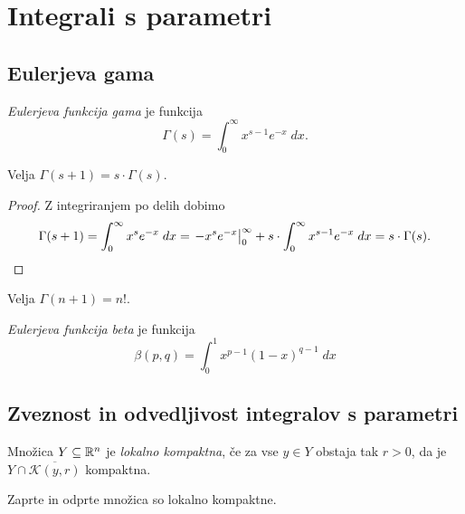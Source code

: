 \section{Integrali s parametri}

\subsection{Eulerjeva gama}


\begin{definicija}
\emph{Eulerjeva funkcija gama} je funkcija
\[
\Gamma(s) = \int_0^\infty x^{s-1} e^{-x}\;dx.
\]
\end{definicija}

\begin{trditev}
Velja $\Gamma(s+1) = s \cdot \Gamma(s)$.
\end{trditev}

\begin{proof}
Z integriranjem po delih dobimo
\[
\Gamma(s+1) =
\int_0^\infty x^s e^{-x}\;dx =
\left. -x^s e^{-x}\right|_{0}^{\infty} +
s \cdot \int_0^\infty x^{s-1} e^{-x}\;dx =
s \cdot \Gamma(s). \qedhere
\]
\end{proof}

\begin{posledica}
Velja $\Gamma(n+1) = n!$.
\end{posledica}

\begin{definicija}
\emph{Eulerjeva funkcija beta} je funkcija
\[
\beta(p,q) = \int_0^1 x^{p-1}(1-x)^{q-1}\;dx
\]
\end{definicija}

\newpage

\subsection{Zveznost in odvedljivost integralov s parametri}

\begin{definicija}
Množica $Y \subseteq \mathbb{R}^n$ je
\emph{lokalno kompaktna}, če za
vse $y \in Y$ obstaja tak $r>0$, da je
$Y \cap \overline{\mathcal{K}(y,r)}$ kompaktna.
\end{definicija}

\begin{opomba}
Zaprte in odprte množica so lokalno kompaktne.
\end{opomba}

